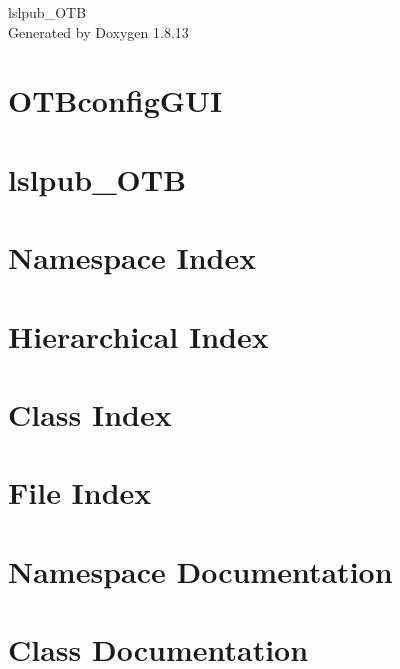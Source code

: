 \documentclass[twoside]{book}
\newcommand{\+}{\discretionary{\mbox{\scriptsize$\hookleftarrow$}}{}{}}
\newcommand{\clearemptydoublepage}{%
  \newpage{\pagestyle{empty}\cleardoublepage}%
}
\begin{document}
\hypersetup{pageanchor=false,
             bookmarksnumbered=true,
             pdfencoding=unicode
            }
\begin{titlepage}
\vspace*{7cm}
\begin{center}%
{\Large lslpub\+\_\+\+O\+TB }\\
\vspace*{1cm}
{\large Generated by Doxygen 1.8.13}\\
\end{center}
\end{titlepage}
\clearemptydoublepage
{}
\tableofcontents
\clearemptydoublepage
{}
\hypersetup{pageanchor=true}

\chapter{O\+T\+Bconfig\+G\+UI}
\label{md__o_t_bconfig_g_u_i__r_e_a_d_m_e}

\chapter{lslpub\+\_\+\+O\+TB}
\label{md__r_e_a_d_m_e}

\chapter{Namespace Index}

\chapter{Hierarchical Index}

\chapter{Class Index}

\chapter{File Index}

\chapter{Namespace Documentation}


\chapter{Class Documentation}











\end{document}
